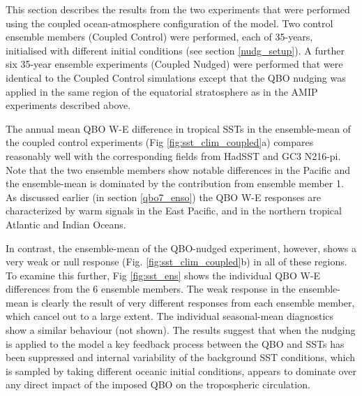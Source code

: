 This section describes the results from the two experiments that were performed using the coupled ocean-atmosphere configuration of the model. Two control ensemble members (Coupled Control) were performed, each of 35-years, initialised with different initial conditions (see section \ref{nudg_setup}). A further six 35-year ensemble experiments (Coupled Nudged) were performed that were identical to the Coupled Control simulations except that the QBO nudging was applied in the same region of the equatorial stratosphere as in the AMIP experiments described above. 


The annual mean QBO W-E difference in tropical SSTs in the ensemble-mean of the coupled control experiments (Fig \ref{fig:sst_clim_coupled}a) compares reasonably well with the corresponding fields from HadSST and GC3 N216-pi. Note that the two ensemble members show notable differences in the Pacific and the ensemble-mean is dominated by the contribution from ensemble member 1. As discussed earlier (in section \ref{qbo7_enso}) the  QBO W-E responses are characterized by warm signals in the East  
Pacific, and in the northern tropical Atlantic and Indian Oceans.

In contrast,  the ensemble-mean of the QBO-nudged experiment, however, shows a very weak or null response (Fig. \ref{fig:sst_clim_coupled}b) in all of these regions. 
To examine this further, Fig \ref{fig:sst_ens} shows the individual QBO W-E differences from the 6 ensemble members. The weak response in the ensemble-mean is clearly the result of very 
different responses from each ensemble member, which cancel out to a large extent. %
The individual seasonal-mean diagnostics show a similar behaviour (not shown). The results suggest that when the nudging is applied to the model a key feedback process between the QBO and SSTs has been suppressed and internal variability of the background SST conditions, which is sampled by taking different oceanic initial conditions, appears to dominate over any direct impact of the imposed QBO on the tropospheric circulation.

